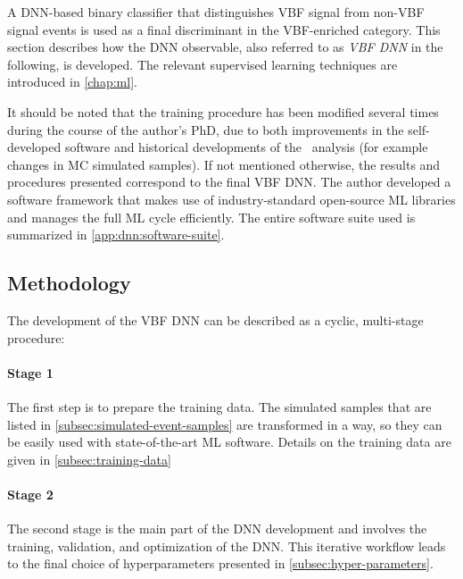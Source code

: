A DNN-based binary classifier that distinguishes VBF signal from non-VBF signal events is used as a final discriminant in the VBF-enriched \TwoJet category.
This section describes how the DNN observable, also referred to as \emph{VBF DNN} in the following, is developed.
The relevant supervised learning techniques are introduced in \cref{chap:ml}.

It should be noted that the training procedure has been modified several times during the course of the author's PhD, due to both improvements in the self-developed software and historical developments of the \HWW\ analysis (for example changes in MC simulated samples). If not mentioned otherwise, the results and procedures presented correspond to the final VBF DNN.
The author developed a software framework that makes use of industry-standard open-source ML libraries and manages the full ML cycle efficiently.
The entire software suite used is summarized in \cref{app:dnn:software-suite}.


\subsection{Methodology}
The development of the VBF DNN can be described as a cyclic, multi-stage procedure:

\paragraph{Stage 1}
The first step is to prepare the training data.
The simulated samples that are listed in \cref{subsec:simulated-event-samples} are transformed in a way, so they can be easily used with state-of-the-art ML software. Details on the training data are given in \cref{subsec:training-data}

\paragraph{Stage 2}
The second stage is the main part of the DNN development and involves the training, validation, and optimization of the DNN.
This iterative workflow leads to the final choice of hyperparameters presented in \cref{subsec:hyper-parameters}.

